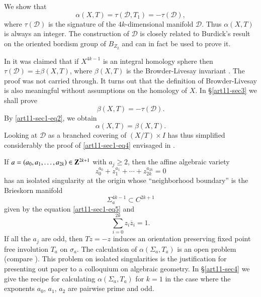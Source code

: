 We show that
$$
\alpha(X,T)=\tau(\mathscr{D},T_{1})=-\tau(\mathscr{D}),
$$\pageoriginale
where $\tau(\mathscr{D})$ is the signature of the $4k$-dimensional manifold $\mathscr{D}$. Thus $\alpha(X,T)$ is always an integer. The construction of $\mathscr{D}$ is closely related to Burdick's result on the oriented bordism group of $B_{Z_{2}}$ and can in fact be used to prove it.

In \cite{art11-key7} it was claimed that if $X^{4k-1}$ is an integral homology sphere then $\tau(\mathscr{D})=\pm \beta(X,T)$, where $\beta(X,T)$ is the Browder-Livesay invariant \cite{art11-key3}. The proof was not carried through. It turns out that the definition of Browder-Livesay is also meaningful without assumptions on the homology of $X$. In \S\ref{art11-sec3} we shall prove
\setcounter{equation}{2}
\begin{equation}
\beta(X,T)=-\tau(\mathscr{D}).\label{art11-sec1-eq3}
\end{equation}
By \eqref{art11-sec1-eq2}, we obtain
\begin{equation}
\alpha(X,T)=\beta(X,T).\label{art11-sec1-eq4}
\end{equation}
Looking at $\mathscr{D}$ as a branched covering of $(X/T)\times I$ has thus simplified considerably the proof of \eqref{art11-sec1-eq4} envisaged in \cite{art11-key7}.

If $a=(a_{0},a_{1},\ldots,a_{2k})\in \mathbf{Z}^{2k+1}$ with $a_{j}\geq 2$, then the affine algebraic variety
\begin{equation}
z^{a_{0}}_{0}+z^{a_{1}}_{1}+\cdots+z^{a_{2k}}_{2k}=0\label{art11-sec1-eq5}
\end{equation}
has an isolated singularity at the origin whose ``neighborhood boundary'' is the Brieskorn manifold \cite{art11-key1}
$$
\Sigma^{4k-1}_{a}\subset C^{2k+1}
$$
given by the equation \eqref{art11-sec1-eq5} and 
\begin{equation}
\sum\limits^{2k}_{i=0}z_{i}\overline{z}_{i}=1.\label{art11-sec1-eq6}
\end{equation}
If all the $a_{j}$ are odd, then $Tz=-z$ induces an orientation preserving fixed point free involution $T_{a}$ on $\sigma_{a}$. The calculation of $\alpha(\Sigma_{a},T_{a})$ is an open problem (compare \cite{art11-key7}). This problem on isolated singularities is the justification for presenting out paper to a colloquium on algebraic geometry. In \S\ref{art11-sec4} we give the recipe for calculating $\alpha(\Sigma_{a},T_{a})$ for $k=1$ in the case where the exponents $a_{0}$, $a_{1}$, $a_{2}$ are pairwise prime and odd.

